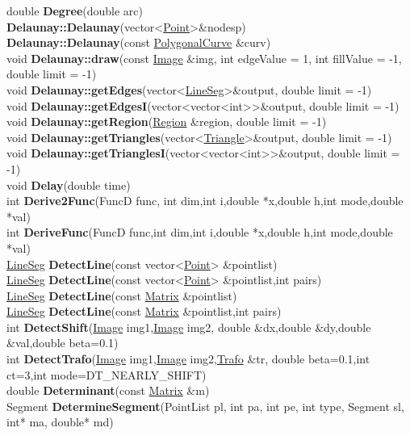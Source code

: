 \documentclass[10pt,titlepage]{article}
\def\functionlistentry#1#2#3#4#5#6{\noindent #1 {\bf #2}(#3) \dotfill #6\\}
\def\letterref#1{}
\def\letterlabelend#1{}
\begin{document}
{{\letterref{De}
\letterref{Di}
\letterref{Do}
\letterref{Dr}
\letterref{Du}
\letterlabelend{De}
\functionlistentry{double}{Degree}{double arc}{1349}{numeric}{}
\functionlistentry{}{Delaunay::Delaunay}{vector\textless {}\hyperlink{Point}{Point}\textgreater  \&nodesp}{1302}{graph}{}
\functionlistentry{}{Delaunay::Delaunay}{const \hyperlink{PolygonalCurve}{PolygonalCurve} \&curv}{1303}{graph}{}
\functionlistentry{void}{Delaunay::draw}{const \hyperlink{Image}{Image} \&img, int edgeValue = 1, int fillValue = -1, double limit = -1}{1309}{graph}{}
\functionlistentry{void}{Delaunay::getEdges}{vector\textless {}\hyperlink{LineSeg}{LineSeg}\textgreater  \&output, double limit = -1}{1306}{graph}{}
\functionlistentry{void}{Delaunay::getEdgesI}{vector\textless {}vector\textless {}int\textgreater \textgreater  \&output, double limit = -1}{1307}{graph}{}
\functionlistentry{void}{Delaunay::getRegion}{\hyperlink{Region}{Region} \&region, double limit = -1}{1308}{graph}{}
\functionlistentry{void}{Delaunay::getTriangles}{vector\textless {}\hyperlink{Triangle}{Triangle}\textgreater  \&output, double limit = -1}{1304}{graph}{}
\functionlistentry{void}{Delaunay::getTrianglesI}{vector\textless {}vector\textless {}int\textgreater \textgreater  \&output, double limit = -1}{1305}{graph}{}
\functionlistentry{void}{Delay}{double time}{1445}{genericTools}{}
\functionlistentry{int}{Derive2Func}{FuncD func, int dim,int i,double *x,double h,int mode,double *val}{1401}{numeric}{}
\functionlistentry{int}{DeriveFunc}{FuncD func,int dim,int i,double *x,double h,int mode,double *val}{1400}{numeric}{}
\functionlistentry{\hyperlink{LineSeg}{LineSeg}}{DetectLine}{const vector<\hyperlink{Point}{Point}> \&pointlist}{933}{statistics}{}
\functionlistentry{\hyperlink{LineSeg}{LineSeg}}{DetectLine}{const vector<\hyperlink{Point}{Point}> \&pointlist,int pairs}{934}{statistics}{}
\functionlistentry{\hyperlink{LineSeg}{LineSeg}}{DetectLine}{const \hyperlink{Matrix}{Matrix} \&pointlist}{935}{statistics}{}
\functionlistentry{\hyperlink{LineSeg}{LineSeg}}{DetectLine}{const \hyperlink{Matrix}{Matrix} \&pointlist,int pairs}{936}{statistics}{}
\functionlistentry{int}{DetectShift}{\hyperlink{Image}{Image} img1,\hyperlink{Image}{Image} img2, double \&dx,double \&dy,double \&val,double beta=0.1}{1252}{registration}{}
\functionlistentry{int}{DetectTrafo}{\hyperlink{Image}{Image} img1,\hyperlink{Image}{Image} img2,\hyperlink{Trafo}{Trafo} \&tr, double beta=0.1,int ct=3,int mode=DT\_NEARLY\_SHIFT}{1253}{registration}{}
\functionlistentry{double}{Determinant}{const \hyperlink{Matrix}{Matrix} \&m}{1118}{matrixAlgebra}{}
\functionlistentry{Segment}{DetermineSegment}{PointList pl, int pa, int pe, int type, Segment sl, int* ma, double* md}{1188}{fitting}{}

}}
\end{document}

